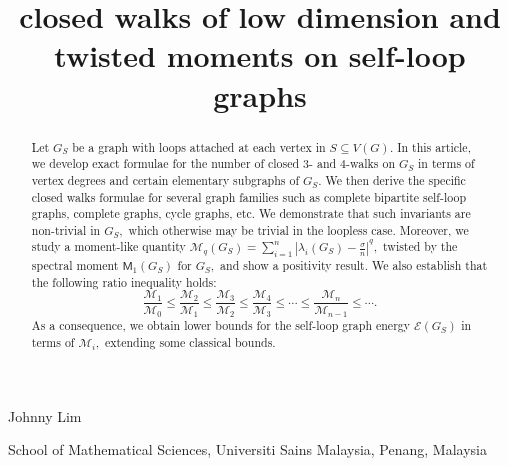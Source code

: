 \documentclass[12pt,a4paper,reqno]{amsart}
\title[]{closed walks of low dimension and twisted moments on self-loop graphs}
\makeatletter
\numberwithin{equation}{section}
\theoremstyle{plain}
\theoremstyle{definition}
\newcommand{\<}{\langle}
\renewcommand{\>}{\rangle}
\newcommand{\cE}{{\mathcal E}}
\newcommand{\cM}{{\mathcal M}}
\renewcommand{\thefootnote}{\fnsymbol{footnote}}
\newcommand{\authorfootnotes}{\renewcommand\thefootnote{\@fnsymbol\c@footnote}}%
\makeatother
\begin{document}
\begin{center}
    \vspace{-1cm}
	\maketitle
	
	\normalsize
    \authorfootnotes
    Johnny Lim%
	\par \bigskip



        \small{School of Mathematical Sciences, Universiti Sains Malaysia, Penang, Malaysia}\par \bigskip

\end{center}

\begin{abstract}
Let $G_S$ be a graph with loops attached at each vertex in $S \subseteq V(G).$ In this article, we develop exact formulae for the number of closed $3$- and $4$-walks on $G_S$ in terms of vertex degrees and certain elementary subgraphs of $G_S.$ We then derive the specific closed walks formulae for several graph families such as complete bipartite self-loop graphs, complete graphs, cycle graphs, etc. We demonstrate that such invariants are non-trivial in $G_S,$ which otherwise may be trivial in the loopless case. Moreover, we study a moment-like quantity
$\cM_q(G_S)=\sum^n_{i=1} |\lambda_i(G_S) - \frac{\sigma}{n}|^q,$ twisted by the spectral moment $\mathsf{M}_1(G_S)$ for $G_S,$ and show a positivity result. We also establish that the following ratio inequality holds:
\[
\frac{\cM_{1}}{\cM_{0}} \leq \frac{\cM_{2}}{\cM_{1}} \leq 
\frac{\cM_{3}}{\cM_{2}} \leq \frac{\cM_{4}}{\cM_{3}} \leq \cdots \leq \frac{\cM_{n}}{\cM_{n-1}} \leq \cdots.  
\] As a consequence, we obtain lower bounds for the self-loop graph energy $\cE(G_S)$ in terms of $\cM_i,$ extending some classical bounds.  %
\end{abstract}
\end{document}
